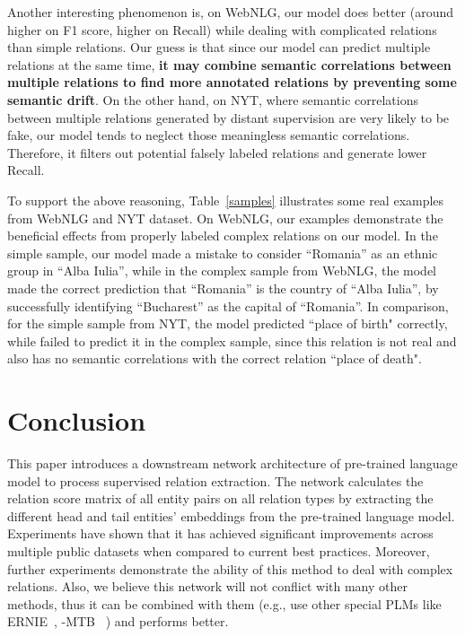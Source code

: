 \documentclass[11pt,a4paper]{article}
\begin{document}
Another interesting phenomenon is, on WebNLG, our model does better (around  higher on F1 score,  higher on Recall) while dealing with complicated relations than simple relations.  Our guess is that since our model can predict multiple relations at the same time, \textbf{it may combine semantic correlations between multiple relations to find more annotated relations by preventing some semantic drift}. On the other hand, on NYT, where semantic correlations between multiple relations generated by distant supervision are very likely to be fake, our model tends to neglect those meaningless semantic correlations. Therefore, it filters out potential falsely labeled relations and generate lower Recall.

To support the above reasoning, Table~\ref{samples} illustrates some real examples from WebNLG and NYT dataset. On WebNLG, our examples demonstrate the beneficial effects from properly labeled complex relations on our model. In the simple sample, our model made a mistake to consider “Romania” as an ethnic group in “Alba Iulia”, while in the complex sample from WebNLG, the model made the correct prediction that “Romania” is the country of “Alba Iulia”, by successfully identifying “Bucharest” as the capital of “Romania”. In comparison, for the simple sample from NYT, the model predicted ``place of birth" correctly, while failed to predict it in the complex sample, since this relation is not real and also has no semantic correlations with the correct relation ``place of death".
\iffalse
Table~\ref{samples} illustrates some real examples and predictions of our model in NYT and WebNLG.  Therefore, our model catches no extra messages to help to predict a fake relation. In comparison, for simple sample from WebNLG, the model made a mistake to consider ``Romania" as an ethnic group in ``Alba Iulia", while in complex sample from WebNLG, the model find ``Bucharest" is the capital of ``Romania" thus made correct prediction that ``Romania" is the country of ``Alba Iulia". In this situation, the model benefits from complex relations.
\fi





\section{Conclusion}


This paper introduces a downstream network architecture of pre-trained language model to process supervised relation extraction. The network calculates the relation score matrix of all entity pairs on all relation types by extracting the different head and tail entities' embeddings from the pre-trained language model. Experiments have shown that it has achieved significant improvements across multiple public datasets when compared to current best practices. Moreover, further experiments demonstrate the ability of this method to deal with complex relations. 
Also, we believe this network will not conflict with many other methods, thus it can be combined with them (e.g., use other special PLMs like ERNIE~\cite{zhang2019ernie}, -MTB ~\cite{soares2019matching}) and performs better.
\end{document}
